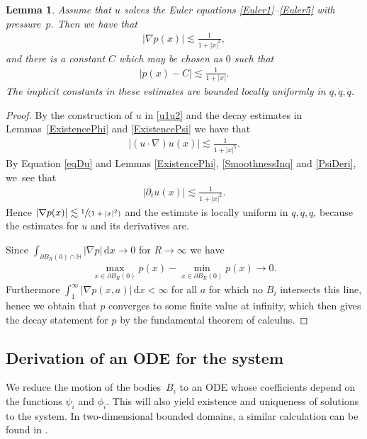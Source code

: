 \documentclass[10pt]{amsart}
\newcommand{\spfrac}[2]{\sfrac{#1}{(#2)}}
\newtheorem{lemma}[theorem]{Lemma}
\theoremstyle{definition}
\newcommand\dd{\,\mathrm{d}}
\newcommand\dx{\dd x}
\let\de\partial
\begin{document}
\begin{lemma}\label{Decayp}
Assume that $u$ solves the Euler equations \eqref{Euler1}--\eqref{Euler5} with pressure~$p$.
Then we have that
\begin{align*}|\nabla p(x)|\lesssim \frac{1}{1+|x|^2},
\end{align*}
and there is a constant $C$ which may be chosen as $0$ such that
\begin{align*}|p(x)-C|\lesssim \frac{1}{1+|x|}.
\end{align*}
The implicit constants in these estimates are bounded locally uniformly in $q,\dot{q},\ddot{q}$.
\end{lemma}
\begin{proof}
By the construction of $u$ in \eqref{u1u2} and the decay estimates in Lem\-mas~\ref{ExistencePhi} and \ref{ExistencePsi} we have that
\begin{align*}
|(u\cdot\nabla)u(x)|\lesssim \frac{1}{1+|x|^5}.
\end{align*}
By Equation \eqref{eqDu} and Lemmas \ref{ExistencePhi}, \ref{SmoothnessInq} and \ref{PsiDeri}, we~see that
\begin{align*}
|\de_tu(x)|\lesssim \frac{1}{1+|x|^2}.
\end{align*}
Hence $|\nabla p(x)|\lesssim \spfrac{1}{1+|x|^2}$ and the estimate is locally uniform in $q,\dot{q},\ddot{q}$, because the estimates for $u$ and its derivatives are.

Since $\int_{\de B_R(0)\cap \mathbb{H}}|\nabla p|\dx\to 0$ for $R\to\infty$ we have
\begin{align*}
\max_{x\in \de B_R(0)} p(x)-\min_{x\in \de B_R(0)} p(x)\to 0.
\end{align*}
Furthermore $\int_1^\infty |\nabla p(x,a)|\dx<\infty$ for all $a$ for which no $B_i$ intersects this line, hence we obtain that $p$ converges to some finite value at infinity, which then gives the decay statement for $p$ by the fundamental theorem of calculus.
\end{proof}

\subsection{Derivation of an ODE for the system}
We reduce the motion of the bodies~$B_i$ to an ODE whose coefficients depend on the functions $\psi_i$ and $\phi_i$. This will also yield existence and uniqueness of solutions to the system.
In two-dimensional bounded domains, a similar calculation can be found \eg in \cite{GlassMunnierSueur2}.
\end{document}
